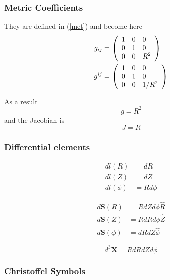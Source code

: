 \subsubsection{Metric Coefficients}

They are defined in (\ref{met}) and become here 
\begin{align}
g_{ij} & =\left( 
\begin{array}{lll}
1 & 0 & 0 \\ 
0 & 1 & 0 \\ 
0 & 0 & R^{2}%
\end{array}
\right) \\
g^{ij} & =\left( 
\begin{array}{lll}
1 & 0 & 0 \\ 
0 & 1 & 0 \\ 
0 & 0 & 1/R^{2}%
\end{array}
\right)  \notag
\end{align}

As a result 
\begin{equation}
g=R^{2}
\end{equation}
and the Jacobian is 
\begin{equation}
J=R
\end{equation}

\subsubsection{Differential elements}

\begin{align}
dl\left( R\right) & =dR \\
dl\left( Z\right) & =dZ \\
dl\left( \phi\right) & =Rd\phi
\end{align}

\begin{align}
d\mathbf{S}\left( R\right) & =RdZd\phi\widehat{R} \\
d\mathbf{S}\left( Z\right) & =RdRd\phi\widehat{Z} \\
d\mathbf{S}\left( \phi\right) & =dRdZ\widehat{\phi}
\end{align}

\begin{equation}
d^{3}\mathbf{X}=RdRdZd\phi
\end{equation}

\subsubsection{Christoffel Symbols}

